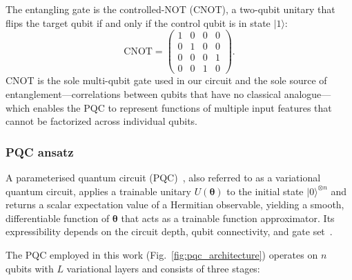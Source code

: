 The entangling gate is the controlled-NOT (CNOT), a two-qubit unitary that flips the target qubit if and only if the control qubit is in state $|1\rangle$:
\begin{equation}
  \mathrm{CNOT} =
  \begin{pmatrix} 1 & 0 & 0 & 0 \\
                  0 & 1 & 0 & 0 \\
                  0 & 0 & 0 & 1 \\
                  0 & 0 & 1 & 0 \end{pmatrix}.
\end{equation}
CNOT is the sole multi-qubit gate used in our circuit and the sole source of entanglement---correlations between qubits that have no classical analogue---which enables the PQC to represent functions of multiple input features that cannot be factorized across individual qubits.

\subsubsection{PQC ansatz}
\label{sec:circuit_architecture}

A parameterised quantum circuit (PQC)~\citep{benedetti2019parameterized}, also referred to as a variational quantum circuit, applies a trainable unitary $U(\boldsymbol{\theta})$ to the initial state $|0\rangle^{\otimes n}$ and returns a scalar expectation value of a Hermitian observable, yielding a smooth, differentiable function of $\boldsymbol{\theta}$ that acts as a trainable function approximator. Its expressibility depends on the circuit depth, qubit connectivity, and gate set~\citep{sim2019expressibility}.

The PQC employed in this work (Fig.~\ref{fig:pqc_architecture}) operates on $n$ qubits with $L$ variational layers and consists of three stages:

